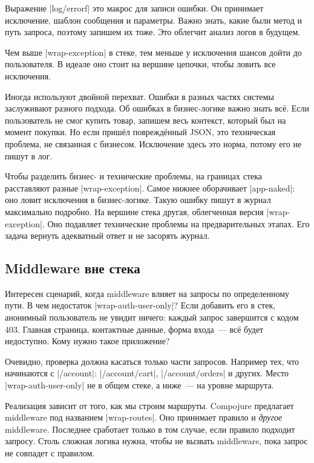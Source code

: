 
Выражение \spverb|log/errorf| это макрос для записи ошибки. Он принимает
исключение, шаблон сообщения и параметры. Важно знать, какие были метод и путь
запроса, поэтому запишем их тоже. Это облегчит анализ логов в будущем.

Чем выше \spverb|wrap-exception| в стеке, тем меньше у исключения шансов дойти
до пользователя. В идеале оно стоит на вершине цепочки, чтобы ловить все
исключения.

Иногда используют двойной перехват. Ошибки в разных частях системы заслуживают
разного подхода. Об ошибках в бизнес-логике важно знать вс\"{е}. Если
пользователь не смог купить товар, запишем весь контекст, который был на момент
покупки. Но если приш\"{е}л поврежд\"{е}нный JSON, это техническая проблема, не
связанная с бизнесом. Исключение здесь это норма, потому его не пишут в лог.

Чтобы разделить бизнес- и технические проблемы, на границах стека расставляют
разные \spverb|wrap-exception|. Самое нижнее оборачивает \spverb|app-naked|: оно
ловит исключения в бизнес-логике. Такую ошибку пишут в журнал максимально
подробно. На вершине стека другая, облегченная версия \spverb|wrap-exception|.
Оно подавляет технические проблемы на предварительных этапах. Его задача вернуть
адекватный ответ и не засорять журнал.

\subsection{Middleware вне стека}


Интересен сценарий, когда middleware влияет на запросы по определенному пути. В
чем недостаток \spverb|wrap-auth-user-only|? Если добавить его в стек, анонимный
пользователь не увидит ничего: каждый запрос завершится с кодом 403. Главная
страница, контактные данные, форма входа~--- вс\"{е} будет недоступно. Кому
нужно такое приложение?

Очевидно, проверка должна касаться только части запросов. Например тех, что
начинаются с \spverb|/account|: \spverb|/account/cart|, \spverb|/account/orders|
и других. Место \spverb|wrap-auth-user-only| не в общем стеке, а ниже~--- на
уровне маршрута.

Реализация зависит от того, как мы строим маршруты. Compojure предлагает
middleware под названием \spverb|wrap-routes|. Оно принимает правило и
\emph{другое} middleware. Последнее сработает только в том случае, если правило
подходит запросу. Столь сложная логика нужна, чтобы не вызвать middleware, пока
запрос не совпадет с правилом.

